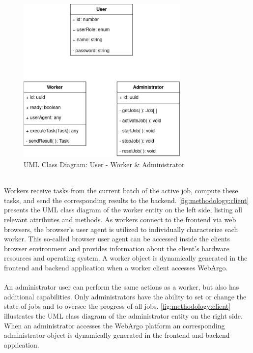 \begin{figure}[htbp]
    \centering
    \includegraphics[width=0.75\textwidth]{gfx/figures/Client.png}
    \caption{\acs{UML} Class Diagram: User - Worker \& Administrator}
    \label{fig:methodology:client}
\end{figure}
~\\
Workers receive tasks from the current batch of the active job, compute these tasks, and send the corresponding results to the backend. \autoref{fig:methodology:client} presents the \ac{UML} class diagram of the worker entity on the left side, listing all relevant attributes and methods. As workers connect to the frontend via web browsers, the browser's user agent is utilized to individually characterize each worker. This so-called browser user agent can be accessed inside the clients browser environment and provides information about the client's hardware resources and operating system. A worker object is dynamically generated in the frontend and backend application when a worker client accesses WebArgo.
\\~\\
An administrator user can perform the same actions as a worker, but also has additional capabilities. Only administrators have the ability to set or change the state of jobs and to oversee the progress of all jobs. \autoref{fig:methodology:client} illustrates the \ac{UML} class diagram of the administrator entity on the right side. When an administrator accesses the WebArgo platform an corresponding administrator object is dynamically generated in the frontend and backend application.

